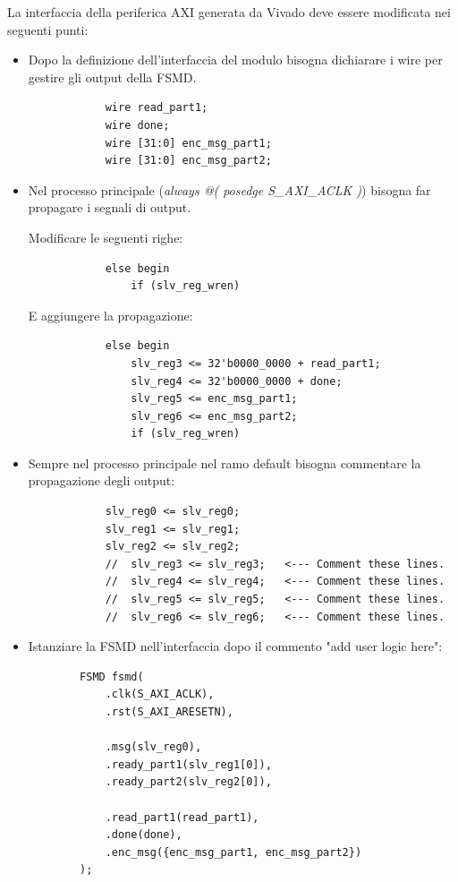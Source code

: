 \documentclass[a4paper]{article}
\begin{document}
La interfaccia della periferica AXI generata da Vivado deve essere modificata nei seguenti punti:
\begin{itemize}
    \item Dopo la definizione dell'interfaccia del modulo bisogna dichiarare i wire per gestire gli output della FSMD.
    
        \begin{verbatim}
            wire read_part1;
            wire done;
            wire [31:0] enc_msg_part1;
            wire [31:0] enc_msg_part2;
        \end{verbatim}

    \item Nel processo principale (\textit{always @( posedge S\_AXI\_ACLK )}) bisogna far propagare i segnali di output.
    
        Modificare le seguenti righe:
        \begin{verbatim}
            else begin
	            if (slv_reg_wren)
        \end{verbatim}

        E aggiungere la propagazione:
        \begin{verbatim}
            else begin
                slv_reg3 <= 32'b0000_0000 + read_part1;
                slv_reg4 <= 32'b0000_0000 + done;
                slv_reg5 <= enc_msg_part1;
                slv_reg6 <= enc_msg_part2;
                if (slv_reg_wren)
        \end{verbatim}

    \item Sempre nel processo principale nel ramo default bisogna commentare la propagazione degli output:
    
        \begin{verbatim}
            slv_reg0 <= slv_reg0;
            slv_reg1 <= slv_reg1;
            slv_reg2 <= slv_reg2;
            //  slv_reg3 <= slv_reg3;   <--- Comment these lines.
            //  slv_reg4 <= slv_reg4;	<--- Comment these lines.
            //  slv_reg5 <= slv_reg5;	<--- Comment these lines.
            //  slv_reg6 <= slv_reg6;	<--- Comment these lines.
        \end{verbatim}

    \item Istanziare la FSMD nell'interfaccia dopo il commento "add user logic here":
    \begin{verbatim}
        FSMD fsmd(
            .clk(S_AXI_ACLK),
            .rst(S_AXI_ARESETN),

            .msg(slv_reg0),
            .ready_part1(slv_reg1[0]),
            .ready_part2(slv_reg2[0]),

            .read_part1(read_part1),
            .done(done),
            .enc_msg({enc_msg_part1, enc_msg_part2})
        );
    \end{verbatim}

\end{itemize}
\end{document}
